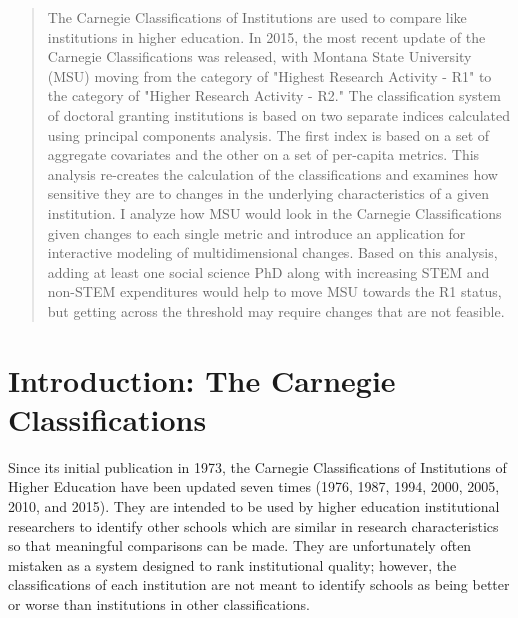 \documentclass[a0,portrait]{a0poster}
\begin{document}
\begin{multicols}{2} %


\color{DarkSlateGray} %

\begin{abstract}
The Carnegie Classifications of Institutions are used to compare like institutions in higher education. In 2015, the most recent update of the Carnegie Classifications was released, with Montana State University (MSU) moving from the category of "Highest Research Activity - R1" to the category of "Higher Research Activity - R2."  The classification system of doctoral granting institutions is based on two separate indices calculated using principal components analysis. The first index is based on a set of aggregate covariates and the other on a set of per-capita metrics. 
This analysis re-creates the calculation of the classifications and examines how sensitive they are to changes in the underlying characteristics of a given institution. I analyze how MSU would look in the Carnegie Classifications given changes to each single metric and introduce an application for interactive modeling of multidimensional changes. Based on this analysis, adding at least one social science PhD along with increasing STEM and non-STEM expenditures would help to move MSU towards the R1 status, but getting across the threshold may require changes that are not feasible.    
\end{abstract}


\color{SaddleBrown} %

\section*{Introduction: The Carnegie Classifications}

Since its initial publication in 1973, the Carnegie Classifications of Institutions of Higher Education have been updated seven times (1976, 1987, 1994, 2000, 2005, 2010, and 2015). They are intended to be used by higher education institutional researchers to identify other schools which are similar in research characteristics so that meaningful comparisons can be made. They are unfortunately often mistaken as a system designed to rank institutional quality; however, the classifications of each institution are not meant to identify schools as being better or worse than institutions in other classifications. \\


\end{multicols}
\end{document}

